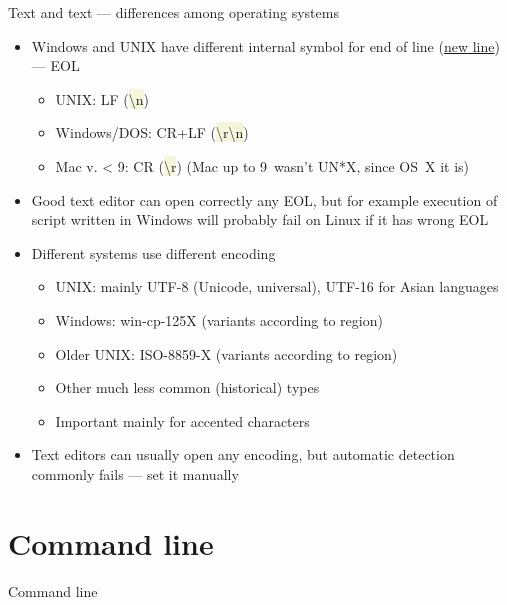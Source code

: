 \documentclass[compress, ucs, xelatex, 11pt, xcolor=svgnames, aspectratio=169,
	hyperref={
		bookmarks=true,
		unicode=true,
		colorlinks=true,
		pdftitle={Linux, command line and MetaCentrum},
		plainpages=false,
		pdfauthor={Vojtech Zeisek},
		pdfsubject={Course about use of Linux command line, writing shell scripts and using MetaCentrum of CESNET},
		pdfcreator={XeLaTeX},
		pdfkeywords={Linux, GNU, BASH, shell, command line, MetaCentrum},
		linkcolor=DarkRed, %
		anchorcolor=DarkBlue, %
		citecolor=Indigo, %
		filecolor=NavyBlue, %
		menucolor=DarkMagenta, %
		urlcolor=DarkBlue, %
		pdftex},
	url={hyphens, lowtilde} %
	]{beamer}
\renewcommand{\texttt}[1]{\colorbox{Beige}{{\ttfamily #1}}}
\begin{document}
\begin{frame}{Text and text --- differences among operating systems}
	\label{eolenc}
	\begin{itemize}
		\item Windows and UNIX have different internal symbol for end of line (\href{https://en.wikipedia.org/wiki/Newline}{new line}) --- EOL
		\begin{itemize}
			\item UNIX: LF (\texttt{\textbackslash n})
			\item Windows/DOS: CR+LF (\texttt{\textbackslash r\textbackslash n})
			\item Mac v. < 9: CR (\texttt{\textbackslash r}) (Mac up to 9~wasn't UN*X, since OS~X it is)
		\end{itemize}
		\item Good text editor can open correctly any EOL, but for example execution of script written in Windows will probably fail on Linux if it has wrong EOL
		\item Different systems use different encoding
		\begin{itemize}
			\item UNIX: mainly UTF-8 (Unicode, universal), UTF-16 for Asian languages
			\item Windows: win-cp-125X (variants according to region)
			\item Older UNIX: ISO-8859-X (variants according to region)
			\item Other much less common (historical) types
			\item Important mainly for accented characters
		\end{itemize}
		\item Text editors can usually open any encoding, but automatic detection commonly fails --- set it manually
	\end{itemize}
\end{frame}

\section{Command line}

\begin{frame}[allowframebreaks]{Command line}
	\tableofcontents[currentsection, sectionstyle=show/hide, hideothersubsections]
\end{frame}
\end{document}
